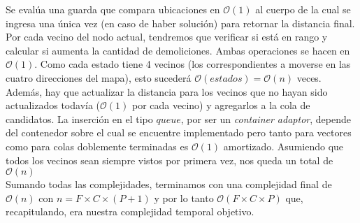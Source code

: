     Se evalúa una guarda que compara ubicaciones en $\mathcal{O}(1)$ al cuerpo de la cual se ingresa una única vez (en caso de haber solución) para retornar la distancia final.
    \\

    Por cada vecino del nodo actual, tendremos que verificar si está en rango y calcular si aumenta la cantidad de demoliciones. Ambas operaciones se hacen en $\mathcal{O}(1)$. Como cada estado tiene 4 vecinos (los correspondientes a moverse en las cuatro direcciones del mapa), esto sucederá $\mathcal{O}(estados) = \mathcal{O}(n) $ veces. Además, hay que actualizar la distancia para los vecinos que no hayan sido actualizados todavía ($\mathcal{O}(1)$ por cada vecino) y agregarlos a la cola de candidatos. La inserción en el tipo $queue$, por ser un \emph{container adaptor}, depende del contenedor sobre el cual se encuentre implementado pero tanto para vectores como para colas doblemente terminadas es $\mathcal{O}(1)$ amortizado. Asumiendo que todos los vecinos sean siempre vistos por primera vez, nos queda un total de $\mathcal{O}(n)$
    \\

    Sumando todas las complejidades, terminamos con una complejidad final de $\mathcal{O}(n)$ con $n = F\times C\times (P+1)$ y por lo tanto $\mathcal{O}(F\times C\times P)$ que, recapitulando, era nuestra complejidad temporal objetivo. 
